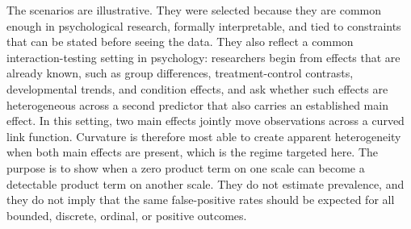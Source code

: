 \documentclass[
  man,
  longtable,
  nolmodern,
  notxfonts,
  notimes,
  colorlinks=true,linkcolor=blue,citecolor=blue,urlcolor=blue]{apa7}
\begin{document}
The scenarios are illustrative. They were selected because they are
common enough in psychological research, formally interpretable, and
tied to constraints that can be stated before seeing the data. They also
reflect a common interaction-testing setting in psychology: researchers
begin from effects that are already known, such as group differences,
treatment-control contrasts, developmental trends, and condition
effects, and ask whether such effects are heterogeneous across a second
predictor that also carries an established main effect. In this setting,
two main effects jointly move observations across a curved link
function. Curvature is therefore most able to create apparent
heterogeneity when both main effects are present, which is the regime
targeted here. The purpose is to show when a zero product term on one
scale can become a detectable product term on another scale. They do not
estimate prevalence, and they do not imply that the same false-positive
rates should be expected for all bounded, discrete, ordinal, or positive
outcomes.
\end{document}
